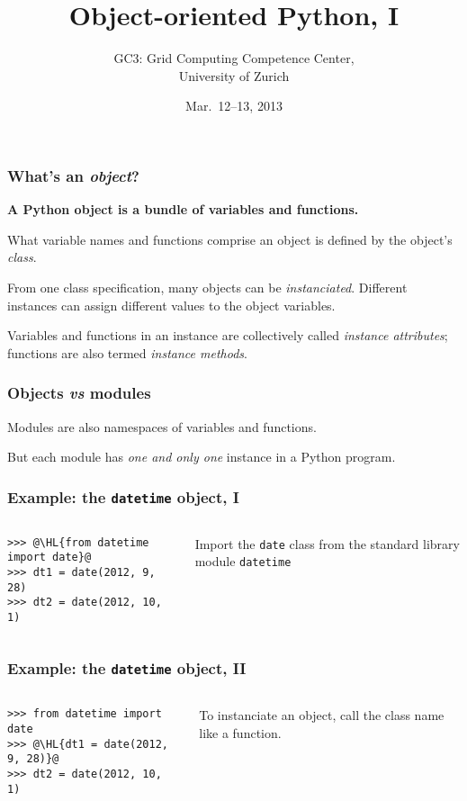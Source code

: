 \documentclass[english,serif,mathserif,xcolor=pdftex,dvipsnames,table]{beamer}
\title[OOP]{%
  Object-oriented Python, I
}
\author[GC3]{%
  GC3: Grid Computing Competence Center, \\
  University of Zurich
}
\date{Mar.~12--13, 2013}
\begin{document}
\maketitle


\begin{frame}
  \frametitle{What's an \emph{object}?}
  \textbf{A Python object is a bundle of variables and functions.}

  \+
  What variable names and functions comprise an object is defined
  by the object's \emph{class}.

  \+
  From one class specification, many objects can be
  \emph{instanciated}.  Different instances can assign different
  values to the object variables.

  \+
  Variables and functions in an instance are collectively called
  \emph{instance attributes}; functions are also termed \emph{instance
    methods}.
\end{frame}


\begin{frame}
  \frametitle{Objects \emph{vs} modules}

  Modules are also namespaces of variables and functions.

  \+
  But each module has \emph{one and only one} instance in a Python
  program.
\end{frame}


\begin{frame}[fragile]
  \frametitle{Example: the \texttt{datetime} object, I}
  \begin{columns}[c]
    \begin{column}{0.5\textwidth}
\begin{lstlisting}
>>> @\HL{from datetime import date}@
>>> dt1 = date(2012, 9, 28)
>>> dt2 = date(2012, 10, 1)
\end{lstlisting}
    \end{column}
    \begin{column}{0.45\textwidth}
      \raggedleft
      Import the \texttt{date} class from the standard
      library module \texttt{datetime}
    \end{column}
  \end{columns}
\end{frame}


\begin{frame}[fragile]
  \frametitle{Example: the \texttt{datetime} object, II}
  \begin{columns}[c]
    \begin{column}{0.5\textwidth}
\begin{lstlisting}
>>> from datetime import date
>>> @\HL{dt1 = date(2012, 9, 28)}@
>>> dt2 = date(2012, 10, 1)
\end{lstlisting}
    \end{column}
    \begin{column}{0.5\textwidth}
      \raggedleft
      To instanciate an object, call the class name like a
      function.
    \end{column}
  \end{columns}
\end{frame}
\end{document}
